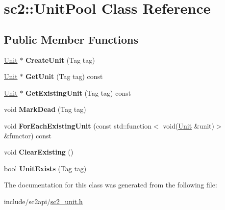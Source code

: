 \hypertarget{classsc2_1_1_unit_pool}{}\section{sc2\+:\+:Unit\+Pool Class Reference}
\label{classsc2_1_1_unit_pool}
\subsection*{Public Member Functions}
\begin{DoxyCompactItemize}
\item 
\mbox{\label{classsc2_1_1_unit_pool_a9cf20402561d203ad9ea5f6338f979b0}} 
\hyperlink{classsc2_1_1_unit}{Unit} $\ast$ {\bfseries Create\+Unit} (Tag tag)
\item 
\mbox{\label{classsc2_1_1_unit_pool_ab3a47342b08eb865dfe3d7e8ad909ffa}} 
\hyperlink{classsc2_1_1_unit}{Unit} $\ast$ {\bfseries Get\+Unit} (Tag tag) const
\item 
\mbox{\label{classsc2_1_1_unit_pool_aa656d3705ea6231162360a1912364b1f}} 
\hyperlink{classsc2_1_1_unit}{Unit} $\ast$ {\bfseries Get\+Existing\+Unit} (Tag tag) const
\item 
\mbox{\label{classsc2_1_1_unit_pool_a02d90e9cac93d1bbc14152f5606977ef}} 
void {\bfseries Mark\+Dead} (Tag tag)
\item 
\mbox{\label{classsc2_1_1_unit_pool_ab818970ee261b66ae917b3329d033815}} 
void {\bfseries For\+Each\+Existing\+Unit} (const std\+::function$<$ void(\hyperlink{classsc2_1_1_unit}{Unit} \&unit)$>$ \&functor) const
\item 
\mbox{\label{classsc2_1_1_unit_pool_a7afc82d6bdc48e0164ba97a6660f4fd7}} 
void {\bfseries Clear\+Existing} ()
\item 
\mbox{\label{classsc2_1_1_unit_pool_ac89bfa437b83ef6ac381e59f5184171d}} 
bool {\bfseries Unit\+Exists} (Tag tag)
\end{DoxyCompactItemize}


The documentation for this class was generated from the following file\+:\begin{DoxyCompactItemize}
\item 
include/sc2api/\hyperlink{sc2__unit_8h}{sc2\+\_\+unit.\+h}\end{DoxyCompactItemize}
